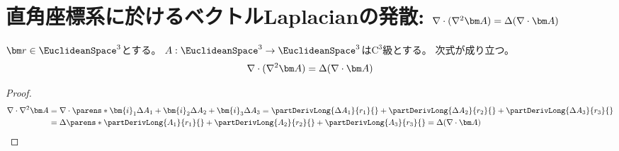     \section{直角座標系に於けるベクトルLaplacianの発散\texorpdfstring{: $\nabla\cdot(\nabla^2\vA) = \Delta(\nabla\cdot\vA)$}{}}
        \label{直角座標系に於けるベクトルLaplacianの発散}
        \begin{shadebox}
            $\vr\in\EuclideanSpace^3$とする。
            $A: \EuclideanSpace^3\to\EuclideanSpace^3$は$\mathrm{C}^3$級とする。
            次式が成り立つ。
            \[ \nabla\cdot(\nabla^2\vA) = \Delta(\nabla\cdot\vA) \]
        \end{shadebox}
        \begin{proof}
            \begin{align*}
                \nabla\cdot\nabla^2\vA &= \nabla\cdot\parens*{\bm{i}_1 \Delta A_1 + \bm{i}_2 \Delta A_2 + \bm{i}_3 \Delta A_3} = \partDerivLong{\Delta A_1}{r_1}{} + \partDerivLong{\Delta A_2}{r_2}{} + \partDerivLong{\Delta A_3}{r_3}{} \\
                &= \Delta\parens*{\partDerivLong{A_1}{r_1}{} + \partDerivLong{A_2}{r_2}{} + \partDerivLong{A_3}{r_3}{}} = \Delta(\nabla\cdot\vA)
            \end{align*}
        \end{proof}
